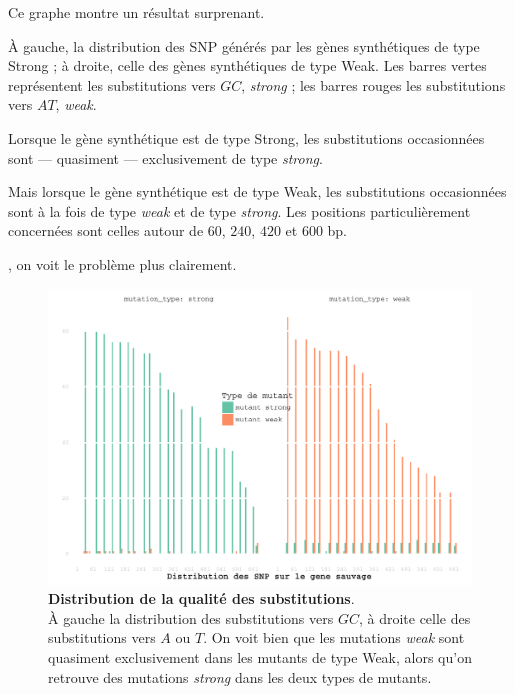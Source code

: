 \documentclass[a4paper]{tufte-handout}
\begin{document}
Ce graphe montre un résultat surprenant. 

À gauche, la distribution des SNP générés par les gènes synthétiques de type
Strong ; à droite, celle des gènes synthétiques de type Weak. Les barres vertes
représentent les substitutions vers \(GC\), \emph{strong} ; les barres rouges les
substitutions vers \(AT\), \emph{weak}.

Lorsque le gène synthétique est de type Strong, les substitutions occasionnées
sont --- quasiment --- exclusivement de type \emph{strong}.

Mais lorsque le gène synthétique est de type Weak, les substitutions
occasionnées sont à la fois de type \emph{weak} et de type \emph{strong}. Les positions
particulièrement concernées sont celles autour de \(60\), \(240\), \(420\) et \(600\)
bp.

\newpage
{}, on voit le problème plus clairement.  


\begin{figure}[h]
  \centering
  \includegraphics[width=\linewidth]{../muttype_plot.pdf}
  \caption{\textbf{Distribution de la qualité des substitutions}. \\
    À gauche la distribution des substitutions vers $GC$, à droite celle des
    substitutions vers $A$ ou $T$. On voit bien que les mutations \emph{weak} sont
    quasiment exclusivement dans les mutants de type Weak, alors qu'on retrouve
    des mutations \emph{strong} dans les deux types de mutants.}
  \label{figure3}
\end{figure}
\end{document}
